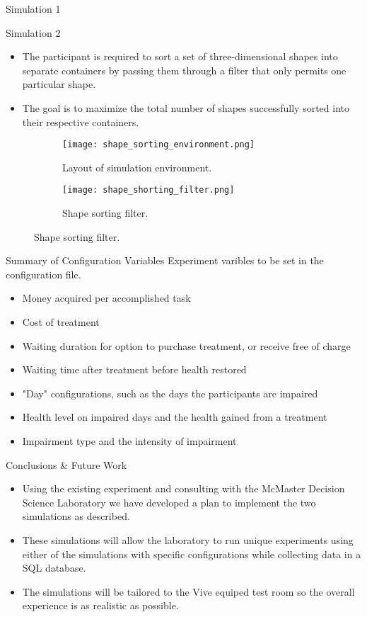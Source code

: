 \documentclass[22pt]{beamer}
\begin{document}
\begin{frame}[fragile]
\begin{textblock}{7.25}
\begin{block}{Simulation 1}
\end{block}
\begin{block}{Simulation 2}
\begin{itemize}
\item The participant is required to sort a set of three-dimensional
shapes into separate containers by passing them
through a filter that only permits one particular shape.
\item The goal is to maximize the total number of shapes successfully sorted into
their respective containers.
\end{itemize}
\begin{figure}
  \begin{subfigure}[b]{0.40\textwidth}
    \texttt{[image: shape\_sorting\_environment.png]}
        \caption{Layout of simulation environment.}
  \end{subfigure}
  \begin{subfigure}[b]{0.40\textwidth}
    \texttt{[image: shape\_shorting\_filter.png]}
        \caption{Shape sorting filter.}
    \end{subfigure}
 \end{figure}
\end{block}


\begin{block}{Summary of Configuration Variables}
Experiment varibles to be set in the configuration file.
\begin{itemize}
\item Money acquired per accomplished task
\item Cost of treatment
\item Waiting duration for option to purchase treatment, or receive free of charge
\item Waiting time after treatment before health restored
\item "Day" configurations, such as the days the participants are impaired
\item Health level on impaired days and the health gained from a treatment
\item Impairment type and the intensity of impairment
\end{itemize}
\end{block}

\begin{block}{Conclusions \& Future Work}
\begin{itemize}
\item Using the existing experiment and consulting with the McMaster Decision Science Laboratory we have developed a plan to implement the two simulations as described.
\item These simulations will allow the laboratory to run unique experiments using either of the simulations with specific configurations while collecting data in a SQL database.
\item The simulations will be tailored to the Vive equiped test room so the overall experience is as realistic as possible.
\end{itemize}
\end{block}


\end{textblock}
\end{frame}
\end{document}
